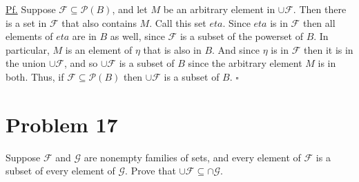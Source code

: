 \documentclass{article}
\newcommand{\Pf}{ \underline{Pf.} }
\newcommand{\qed}{$\square$}
\newcommand{\powerset}[1]{ \mathcal{P} (#1) }
\newcommand{\F}{ \mathcal{F} }
\newcommand{\G}{ \mathcal{G} }
\begin{document}
\Pf Suppose $\F \subseteq \powerset{B}$, and let $M$ be an arbitrary element in $\cup \F$.
Then there is a set in $\F$ that also contains $M$. Call this set $eta$. Since $eta$ is
in $\F$ then all elements of $eta$ are in $B$ as well, since $\F$ is a subset of the
powerset of $B$. In particular, $M$ is an element of $\eta$ that is also in $B$. And since
$\eta$ is in $\F$ then it is in the union $\cup \F$, and so $\cup \F$ is a subset of $B$
since the arbitrary element $M$ is in both. Thus, if $\F \subseteq \powerset{B}$ then
$\cup \F$ is a subset of $B$. \qed


\section{Problem 17}

Suppose $\F$ and $\G$ are nonempty families of sets, and every element of
$\F$ is a subset of every element of $\G$. Prove that $\cup \F \subseteq \cap \G$.
\end{document}

